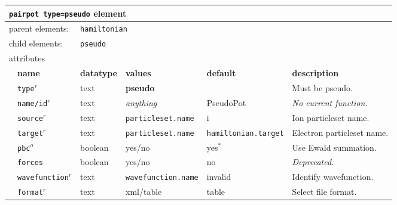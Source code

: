 \FloatBarrier
\begin{table}[h]
\begin{center}
\begin{tabularx}{\textwidth}{l l l l l l }
\hline
\multicolumn{6}{l}{\texttt{pairpot type=pseudo} element} \\
\hline
\multicolumn{2}{l}{parent elements:} & \multicolumn{4}{l}{\texttt{hamiltonian}}\\
\multicolumn{2}{l}{child  elements:} & \multicolumn{4}{l}{\texttt{pseudo}}\\
\multicolumn{2}{l}{attributes}  & \multicolumn{4}{l}{}\\
   &   \bfseries name     & \bfseries datatype & \bfseries values & \bfseries default   & \bfseries description \\
   & \texttt{type}$^r$    &  text              & \textbf{pseudo} &                      & Must be pseudo.         \\
   & \texttt{name/id}$^r$ &  text              & \textit{anything}&  PseudoPot          & \textit{No current function.}\\
   & \texttt{source}$^r$  &  text              & \texttt{particleset.name} &  i                  & Ion particleset name.\\
   & \texttt{target}$^r$  &  text              & \texttt{particleset.name} &\texttt{hamiltonian.target}& Electron particleset name.  \\
   & \texttt{pbc}$^o$     &  boolean           & yes/no           & yes$^*$             & Use Ewald summation.  \\
   & \texttt{forces}      &  boolean           & yes/no           & no                  & \textit{Deprecated.}             \\
   &\texttt{wavefunction}$^r$ &  text          & \texttt{wavefunction.name}& invalid    & Identify wavefunction. \\
   &   \texttt{format}$^r$    &  text          & xml/table        & table               & Select file format.   \\
  \hline
\end{tabularx}
\end{center}
\end{table}
\FloatBarrier

